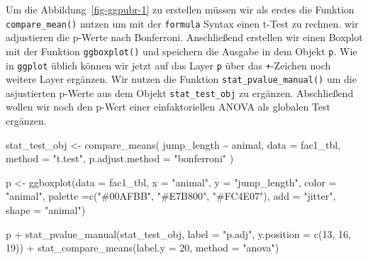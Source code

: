 \documentclass[
  letterpaper,
  DIV=11,
  oneside]{scrreport}
\newenvironment{Shaded}{\begin{snugshade}}{\end{snugshade}}
\newcommand{\AttributeTok}[1]{\textcolor[rgb]{0.40,0.45,0.13}{#1}}
\newcommand{\DecValTok}[1]{\textcolor[rgb]{0.68,0.00,0.00}{#1}}
\newcommand{\FunctionTok}[1]{\textcolor[rgb]{0.28,0.35,0.67}{#1}}
\newcommand{\NormalTok}[1]{\textcolor[rgb]{0.00,0.23,0.31}{#1}}
\newcommand{\OtherTok}[1]{\textcolor[rgb]{0.00,0.23,0.31}{#1}}
\newcommand{\SpecialCharTok}[1]{\textcolor[rgb]{0.37,0.37,0.37}{#1}}
\newcommand{\StringTok}[1]{\textcolor[rgb]{0.13,0.47,0.30}{#1}}
\begin{document}
Um die Abbildung~\ref{fig-ggpubr-1} zu erstellen müssen wir als erstes
die Funktion \texttt{compare\_mean()} nutzen um mit der \texttt{formula}
Syntax einen t-Test zu rechnen. wir adjustieren die p-Werte nach
Bonferroni. Anschließend erstellen wir einen Boxplot mit der Funktion
\texttt{ggboxplot()} und speichern die Ausgabe in dem Objekt \texttt{p}.
Wie in \texttt{ggplot} üblich können wir jetzt auf das Layer \texttt{p}
über das \texttt{+}-Zeichen noch weitere Layer ergänzen. Wir nutzen die
Funktion \texttt{stat\_pvalue\_manual()} um die asjustierten p-Werte aus
dem Objekt \texttt{stat\_test\_obj} zu ergänzen. Abschließend wollen wir
noch den p-Wert einer einfaktoriellen ANOVA als globalen Test ergänzen.

\begin{Shaded}
\begin{Highlighting}[]
\NormalTok{stat\_test\_obj }\OtherTok{\textless{}{-}} \FunctionTok{compare\_means}\NormalTok{(}
\NormalTok{ jump\_length }\SpecialCharTok{\textasciitilde{}}\NormalTok{ animal, }\AttributeTok{data =}\NormalTok{ fac1\_tbl,}
 \AttributeTok{method =} \StringTok{"t.test"}\NormalTok{,}
 \AttributeTok{p.adjust.method =} \StringTok{"bonferroni"}
\NormalTok{)}

\NormalTok{p }\OtherTok{\textless{}{-}} \FunctionTok{ggboxplot}\NormalTok{(}\AttributeTok{data =}\NormalTok{ fac1\_tbl, }\AttributeTok{x =} \StringTok{"animal"}\NormalTok{, }\AttributeTok{y =} \StringTok{"jump\_length"}\NormalTok{,}
               \AttributeTok{color =} \StringTok{"animal"}\NormalTok{, }\AttributeTok{palette =}\FunctionTok{c}\NormalTok{(}\StringTok{"\#00AFBB"}\NormalTok{, }\StringTok{"\#E7B800"}\NormalTok{, }\StringTok{"\#FC4E07"}\NormalTok{),}
               \AttributeTok{add =} \StringTok{"jitter"}\NormalTok{, }\AttributeTok{shape =} \StringTok{"animal"}\NormalTok{)}

\NormalTok{p }\SpecialCharTok{+} \FunctionTok{stat\_pvalue\_manual}\NormalTok{(stat\_test\_obj, }\AttributeTok{label =} \StringTok{"p.adj"}\NormalTok{, }\AttributeTok{y.position =} \FunctionTok{c}\NormalTok{(}\DecValTok{13}\NormalTok{, }\DecValTok{16}\NormalTok{, }\DecValTok{19}\NormalTok{)) }\SpecialCharTok{+}
  \FunctionTok{stat\_compare\_means}\NormalTok{(}\AttributeTok{label.y =} \DecValTok{20}\NormalTok{, }\AttributeTok{method =} \StringTok{"anova"}\NormalTok{)    }
\end{Highlighting}
\end{Shaded}
\end{document}
